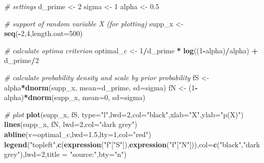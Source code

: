 \documentclass[
]{book}
\newenvironment{Shaded}{\begin{snugshade}}{\end{snugshade}}
\newcommand{\AttributeTok}[1]{\textcolor[rgb]{0.13,0.29,0.53}{#1}}
\newcommand{\CommentTok}[1]{\textcolor[rgb]{0.56,0.35,0.01}{\textit{#1}}}
\newcommand{\DecValTok}[1]{\textcolor[rgb]{0.00,0.00,0.81}{#1}}
\newcommand{\FloatTok}[1]{\textcolor[rgb]{0.00,0.00,0.81}{#1}}
\newcommand{\FunctionTok}[1]{\textcolor[rgb]{0.13,0.29,0.53}{\textbf{#1}}}
\newcommand{\NormalTok}[1]{#1}
\newcommand{\OtherTok}[1]{\textcolor[rgb]{0.56,0.35,0.01}{#1}}
\newcommand{\SpecialCharTok}[1]{\textcolor[rgb]{0.81,0.36,0.00}{\textbf{#1}}}
\newcommand{\StringTok}[1]{\textcolor[rgb]{0.31,0.60,0.02}{#1}}
\begin{document}
\begin{Shaded}
\begin{Highlighting}[]
\CommentTok{\# settings}
\NormalTok{d\_prime }\OtherTok{\textless{}{-}} \DecValTok{2}
\NormalTok{sigma }\OtherTok{\textless{}{-}} \DecValTok{1}   
\NormalTok{alpha }\OtherTok{\textless{}{-}} \FloatTok{0.5}

\CommentTok{\# support of random variable X (for plotting)}
\NormalTok{supp\_x }\OtherTok{\textless{}{-}} \FunctionTok{seq}\NormalTok{(}\SpecialCharTok{{-}}\DecValTok{2}\NormalTok{,}\DecValTok{4}\NormalTok{,}\AttributeTok{length.out=}\DecValTok{500}\NormalTok{) }

\CommentTok{\# calculate optima criterion}
\NormalTok{optimal\_c }\OtherTok{\textless{}{-}} \DecValTok{1}\SpecialCharTok{/}\NormalTok{d\_prime }\SpecialCharTok{*} \FunctionTok{log}\NormalTok{((}\DecValTok{1}\SpecialCharTok{{-}}\NormalTok{alpha)}\SpecialCharTok{/}\NormalTok{alpha) }\SpecialCharTok{+}\NormalTok{ d\_prime}\SpecialCharTok{/}\DecValTok{2}

\CommentTok{\# calculate probability density and scale by prior probability}
\NormalTok{fS }\OtherTok{\textless{}{-}}\NormalTok{ alpha}\SpecialCharTok{*}\FunctionTok{dnorm}\NormalTok{(supp\_x, }\AttributeTok{mean=}\NormalTok{d\_prime, }\AttributeTok{sd=}\NormalTok{sigma)}
\NormalTok{fN }\OtherTok{\textless{}{-}}\NormalTok{ (}\DecValTok{1}\SpecialCharTok{{-}}\NormalTok{alpha)}\SpecialCharTok{*}\FunctionTok{dnorm}\NormalTok{(supp\_x, }\AttributeTok{mean=}\DecValTok{0}\NormalTok{, }\AttributeTok{sd=}\NormalTok{sigma)}

\CommentTok{\# plot }
\FunctionTok{plot}\NormalTok{(supp\_x, fS, }\AttributeTok{type=}\StringTok{"l"}\NormalTok{,}\AttributeTok{lwd=}\DecValTok{2}\NormalTok{,}\AttributeTok{col=}\StringTok{"black"}\NormalTok{,}\AttributeTok{xlab=}\StringTok{"X"}\NormalTok{,}\AttributeTok{ylab=}\StringTok{"p(X)"}\NormalTok{)}
\FunctionTok{lines}\NormalTok{(supp\_x, fN, }\AttributeTok{lwd=}\DecValTok{2}\NormalTok{,}\AttributeTok{col=}\StringTok{"dark grey"}\NormalTok{)}
\FunctionTok{abline}\NormalTok{(}\AttributeTok{v=}\NormalTok{optimal\_c,}\AttributeTok{lwd=}\FloatTok{1.5}\NormalTok{,}\AttributeTok{lty=}\DecValTok{1}\NormalTok{,}\AttributeTok{col=}\StringTok{"red"}\NormalTok{)}
\FunctionTok{legend}\NormalTok{(}\StringTok{"topleft"}\NormalTok{,}\FunctionTok{c}\NormalTok{(}\FunctionTok{expression}\NormalTok{(}\StringTok{"f"}\NormalTok{[}\StringTok{"S"}\NormalTok{]),}\FunctionTok{expression}\NormalTok{(}\StringTok{"f"}\NormalTok{[}\StringTok{"N"}\NormalTok{])),}\AttributeTok{col=}\FunctionTok{c}\NormalTok{(}\StringTok{"black"}\NormalTok{,}\StringTok{"dark grey"}\NormalTok{),}\AttributeTok{lwd=}\DecValTok{2}\NormalTok{,}\AttributeTok{title =} \StringTok{"source:"}\NormalTok{,}\AttributeTok{bty=}\StringTok{"n"}\NormalTok{)}
\end{Highlighting}
\end{Shaded}
\end{document}
